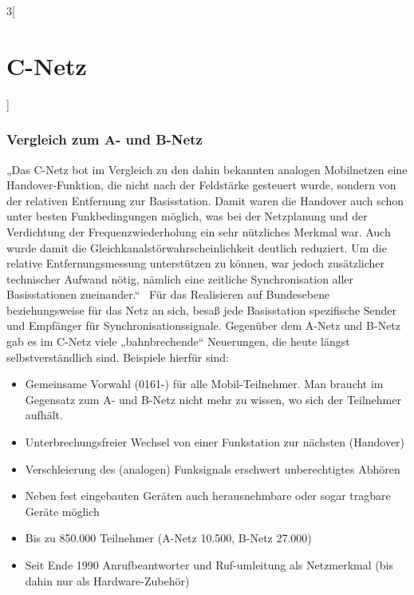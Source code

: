 \begin{multicols}{3}[\section{C-Netz}]
\subsubsection*{Vergleich zum A- und B-Netz}
„Das C-Netz bot im Vergleich zu den dahin bekannten analogen Mobilnetzen eine Handover-Funktion, die nicht nach der Feldstärke gesteuert wurde, sondern von der relativen Entfernung zur Basisstation. Damit waren die Handover auch schon unter besten Funkbedingungen möglich, was bei der Netzplanung und der Verdichtung der Frequenzwiederholung ein sehr nützliches Merkmal war. Auch wurde damit die Gleichkanalstörwahrscheinlichkeit deutlich reduziert. Um die relative Entfernungsmessung unterstützen zu können, war jedoch zusätzlicher technischer Aufwand nötig, nämlich eine zeitliche Synchronisation aller Basisstationen zueinander.“~\cite{c-netz.3}  Für das Realisieren auf Bundesebene beziehungsweise für das Netz an sich, besaß jede Basisstation spezifische Sender und Empfänger für Synchronisationssignale.
Gegenüber dem A-Netz und B-Netz gab es im C-Netz viele „bahnbrechende“ Neuerungen, die heute längst selbstverständlich sind. Beispiele hierfür sind:
\begin{itemize}
	\item Gemeinsame Vorwahl (0161-) für alle Mobil-Teilnehmer. Man braucht im Gegensatz zum A- und B-Netz nicht mehr zu wissen, wo sich der Teilnehmer aufhält.
	\item Unterbrechungsfreier Wechsel von einer Funkstation zur nächsten (Handover)
	\item Verschleierung des (analogen) Funksignals erschwert unberechtigtes Abhören
	\item Neben fest eingebauten Geräten auch herausnehmbare oder sogar tragbare Geräte möglich
	\item Bis zu 850.000 Teilnehmer (A-Netz 10.500, B-Netz 27.000)
	\item Seit Ende 1990 Anrufbeantworter und Ruf-umleitung als Netzmerkmal (bis dahin nur als Hardware-Zubehör)~\cite{c-netz.3}
\end{itemize}




\end{multicols}
